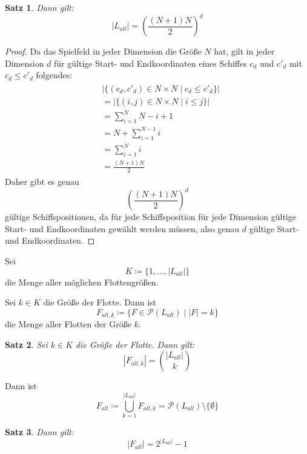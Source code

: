 \documentclass[a4paper,12pt]{llncs}
\numberwithin{equation}{section}
\newtheorem{satz}{Satz}
\begin{document}
\begin{satz}
Dann gilt:
\[
|L_{all}|=\left(\frac{(N+1) N}{2}\right)^d
\]
\end{satz}

\begin{proof}
Da das Spielfeld in jeder Dimension die Größe $N$ hat, gilt in jeder Dimension $d$ für gültige Start- und Endkoordinaten eines Schiffes $c_d$ und $c'_d$ mit $c_d \leq c'_d$ folgendes:
\begin{align}
\begin{split}
&|\{(c_d, c'_d) \in N \times N \mid c_d \leq c'_d\}|\\
&=|\{(i, j) \in N \times N \mid i \leq j\}|\\
&=\sum_{i=1}^N N - i + 1\\
&=N + \sum_{i=1}^{N-1} i\\
&=\sum_{i=1}^{N} i\\
&= \frac{(N + 1) N}{2}
\nonumber
\end{split}
\end{align}
Daher gibt es genau
\[
\left(\frac{(N+1) N}{2}\right)^d
\]
gültige Schiffspositionen, da für jede Schiffsposition für jede Dimension gültige Start- und Endkoordinaten gewählt werden müssen, also genau $d$ gültige Start- und Endkoordinaten.
\end{proof}

\begin{definition}
Sei 
\[
K \coloneqq \{1, \dots, |L_{all}|\}
\]
die Menge aller möglichen Flottengrößen.
\end{definition}

\begin{definition}
Sei $k \in K$ die Größe der Flotte.
Dann ist
\[
F_{all,k} \coloneqq\{F \in \mathcal{P}(L_{all}) \mid |F| = k\}
\]
die Menge aller Flotten der Größe $k$.
\end{definition}

\begin{satz}
Sei $k \in K$ die Größe der Flotte.
Dann gilt:
\[
|F_{all,k}|=\binom{|L_{all}|}{k}
\]
\end{satz}

\begin{definition}
Dann ist
\[
F_{all} \coloneqq \bigcup_{k=1}^{|L_{all}|} F_{all,k} = \mathcal{P}(L_{all}) \setminus \{\emptyset\}
\]
\end{definition}

\begin{satz}
Dann gilt:
\[
|F_{all}|=2^{|L_{all}|} - 1
\]
\end{satz}
\end{document}
